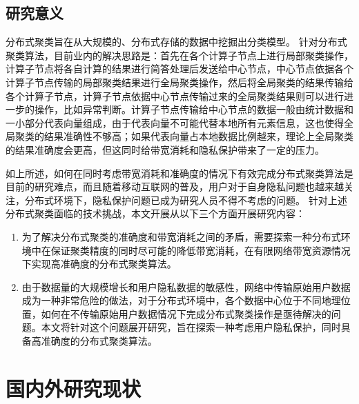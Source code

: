 \subsection{研究意义}
分布式聚类旨在从大规模的、分布式存储的数据中挖掘出分类模型。
针对分布式聚类算法，目前业内的解决思路是：首先在各个计算子节点上进行局部聚类操作，计算子节点将各自计算的结果进行简答处理后发送给中心节点，中心节点依据各个计算子节点传输的局部聚类结果进行全局聚类操作，然后将全局聚类的结果传输给各个计算子节点，计算子节点依据中心节点传输过来的全局聚类结果则可以进行进一步的操作，比如异常判断。计算子节点传输给中心节点的数据一般由统计数据和一小部分代表向量组成，由于代表向量不可能代替本地所有元素信息，这也使得全局聚类的结果准确性不够高；如果代表向量占本地数据比例越来，理论上全局聚类的结果准确度会更高，但这同时给带宽消耗和隐私保护带来了一定的压力。

如上所述，如何在同时考虑带宽消耗和准确度的情况下有效完成分布式聚类算法是目前的研究难点，而且随着移动互联网的普及，用户对于自身隐私问题也越来越关注，分布式环境下，隐私保护问题已成为研究人员不得不考虑的问题。
针对上述分布式聚类面临的技术挑战，本文开展从以下三个方面开展研究内容：
\begin{enumerate}
\item 为了解决分布式聚类的准确度和带宽消耗之间的矛盾，需要探索一种分布式环境中在保证聚类精度的同时尽可能的降低带宽消耗，在有限网络带宽资源情况下实现高准确度的分布式聚类算法。
\item 由于数据量的大规模增长和用户隐私数据的敏感性，网络中传输原始用户数据成为一种非常危险的做法，对于分布式环境中，各个数据中心位于不同地理位置，如何在不传输原始用户数据情况下完成分布式聚类操作是亟待解决的问题。本文将针对这个问题展开研究，旨在探索一种考虑用户隐私保护，同时具备高准确度的分布式聚类算法。
\end{enumerate}


\section{国内外研究现状}


